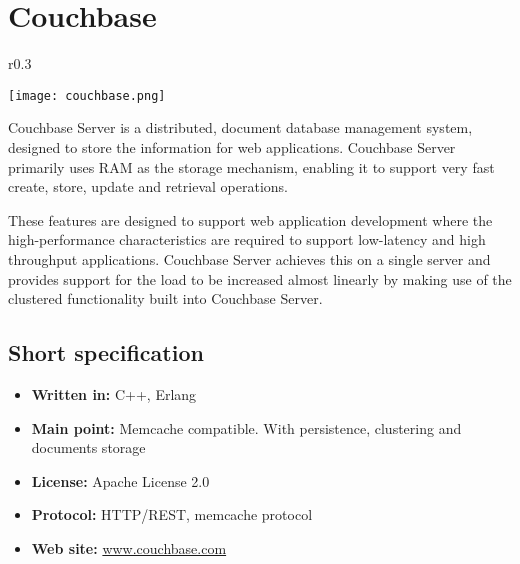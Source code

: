 \chapter{Couchbase}

\begin{wrapfigure}{r}{0.3\textwidth}
  \vspace{-40pt}
  \begin{center}
    \texttt{[image: couchbase.png]}
  \end{center}
  \vspace{-20pt}
\end{wrapfigure}
Couchbase Server is a distributed, document database management system, designed to store the information for web applications. Couchbase Server primarily uses RAM as the storage mechanism, enabling it to support very fast create, store, update and retrieval operations.

These features are designed to support web application development where the high-performance characteristics are required to support low-latency and high throughput applications. Couchbase Server achieves this on a single server and provides support for the load to be increased almost linearly by making use of the clustered functionality built into Couchbase Server.

\section{Short specification}

\begin{itemize}
  \item \textbf{Written in:} C++, Erlang
  \item \textbf{Main point:} Memcache compatible. With persistence, clustering and documents storage
  \item \textbf{License:} Apache License 2.0
  \item \textbf{Protocol:} HTTP/REST, memcache protocol
  \item \textbf{Web site:} \href{http://www.couchbase.com/}{www.couchbase.com}
\end{itemize}

